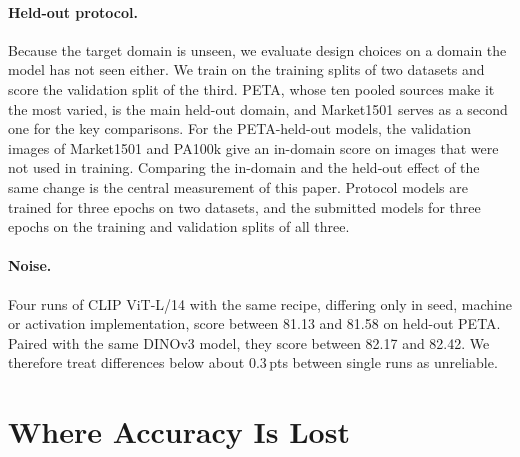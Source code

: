 \documentclass[10pt,twocolumn,letterpaper]{article}
\newcommand{\pts}{\,pts}
\begin{document}
\begin{table}[t]
\centering\small
\setlength{\tabcolsep}{3pt}
\caption{Training data of UPAR 2027 Track~1.}
\label{tab:data}
\end{table}

\paragraph{Held-out protocol.} Because the target domain is unseen, we evaluate design choices on a domain the model has not seen either. We train on the training splits of two datasets and score the validation split of the third. PETA, whose ten pooled sources make it the most varied, is the main held-out domain, and Market1501 serves as a second one for the key comparisons. For the PETA-held-out models, the validation images of Market1501 and PA100k give an in-domain score on images that were not used in training. Comparing the in-domain and the held-out effect of the same change is the central measurement of this paper. Protocol models are trained for three epochs on two datasets, and the submitted models for three epochs on the training and validation splits of all three.

\paragraph{Noise.} Four runs of CLIP ViT-L/14 with the same recipe, differing only in seed, machine or activation implementation, score between 81.13 and 81.58 on held-out PETA. Paired with the same DINOv3 model, they score between 82.17 and 82.42. We therefore treat differences below about 0.3\pts{} between single runs as unreliable.

\section{Where Accuracy Is Lost}
\label{sec:loss}
\end{document}
